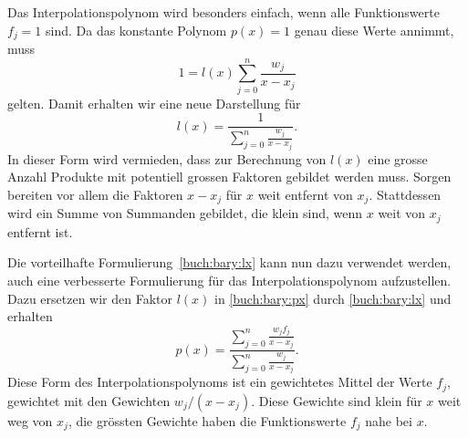 Das Interpolationspolynom wird besonders einfach, wenn alle Funktionswerte
$f_j=1$ sind.
Da das konstante Polynom $p(x)=1$ genau diese Werte annimmt, muss
\[
1 = l(x) \sum_{j=0}^n \frac{w_j}{x-x_j}
\]
gelten.
Damit erhalten wir eine neue Darstellung für 
\begin{equation}
l(x)
=
\frac{1}{\displaystyle\sum_{j=0}^n \frac{w_j}{x-x_j}}.
\label{buch:bary:lx}
\end{equation}
In dieser Form wird vermieden, dass zur Berechnung von $l(x)$ eine
grosse Anzahl Produkte mit potentiell grossen Faktoren gebildet werden
muss.
Sorgen bereiten vor allem die Faktoren $x-x_j$ für $x$ weit entfernt von $x_j$.
Stattdessen wird ein Summe von Summanden gebildet, die klein sind,
wenn $x$ weit von $x_j$ entfernt ist.

Die vorteilhafte Formulierung~\eqref{buch:bary:lx} kann nun dazu
verwendet werden, auch eine verbesserte Formulierung für das
Interpolationspolynom aufzustellen.
Dazu ersetzen wir den Faktor $l(x)$ in \eqref{buch:bary:px}
durch \eqref{buch:bary:lx} und erhalten
\[
p(x)
=
\frac{\displaystyle \sum_{j=0}^n \frac{w_jf_j}{x-x_j}
}{
\displaystyle\sum_{j=0}^n \frac{w_j}{x-x_j}}.
\]
Diese Form des Interpolationspolynoms ist ein gewichtetes Mittel 
der Werte $f_j$, gewichtet mit den Gewichten $w_j/(x-x_j)$.
Diese Gewichte sind klein für $x$ weit weg von $x_j$, die grössten
Gewichte haben die Funktionswerte $f_j$ nahe bei $x$.








